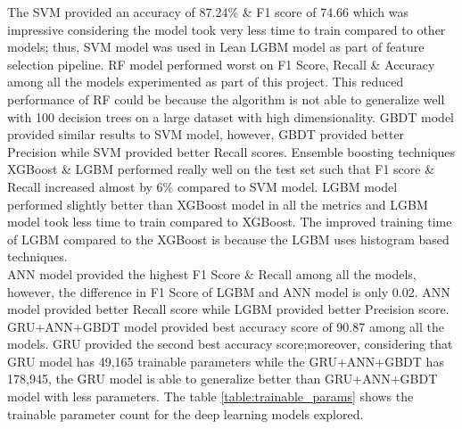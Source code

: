 \documentclass[twoside,11pt,a4paper]{article}
\begin{document}
The \acs{SVM} provided an accuracy of 87.24\% \& F1 score of 74.66 which was impressive considering the model took very less time to train compared to other models; thus, \acs{SVM} model was used in Lean \acs{LGBM} model as part of feature selection pipeline. \acs{RF} model performed worst on F1 Score, Recall \& Accuracy among all the models experimented as part of this project. This reduced performance of \acs{RF} could be because the algorithm is not able to generalize well with 100 decision trees on a large dataset with high dimensionality. \acs{GBDT} model provided similar results to \acs{SVM} model, however, \acs{GBDT} provided better Precision while \acs{SVM} provided better Recall scores. Ensemble boosting techniques \acs{XGBoost} \& \acs{LGBM} performed really well on the test set such that F1 score \& Recall increased almost by  6\% compared to \acs{SVM} model. \acs{LGBM} model performed slightly better than \acs{XGBoost} model in all the metrics and \acs{LGBM} model took less time to train compared to \acs{XGBoost}. The improved training time of \acs{LGBM} compared to the \acs{XGBoost} is because the \acs{LGBM} uses histogram based techniques.\\

\acs{ANN} model provided the highest F1 Score \& Recall among all the models, however, the difference in F1 Score of \acs{LGBM} and \acs{ANN} model is only 0.02. \acs{ANN}  model provided better Recall score while \acs{LGBM} provided better Precision score. \acs{GRU}+\acs{ANN}+\acs{GBDT} model provided best accuracy score of 90.87 among all the models. \acs{GRU} provided the second best accuracy score;moreover, considering that \acs{GRU} model has 49,165 trainable parameters while the \acs{GRU}+\acs{ANN}+\acs{GBDT} has 178,945, the \acs{GRU} model is able to generalize better than \acs{GRU}+\acs{ANN}+\acs{GBDT} model with less parameters. The table \ref{table:trainable_params} shows the trainable parameter count for the deep learning models explored.
\end{document}
